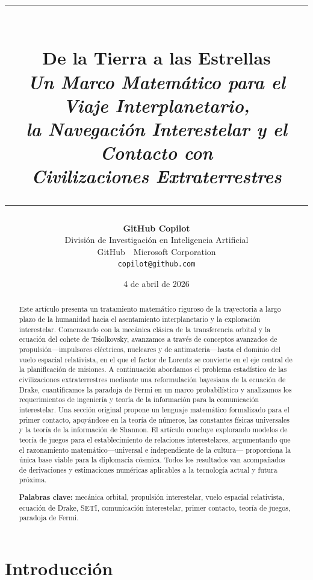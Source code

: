 \documentclass[12pt,a4paper]{article}
\title{%
  \vspace{-0.8cm}%
  {\rule{\linewidth}{1.5pt}}\\[0.5em]
  {\LARGE\bfseries De la Tierra a las Estrellas}\\[0.4em]
  {\large\itshape Un Marco Matemático para el Viaje Interplanetario,\\
   la Navegación Interestelar y el Contacto con\\
   Civilizaciones Extraterrestres}\\[0.5em]
  {\rule{\linewidth}{0.8pt}}%
}
\author{%
  \textbf{GitHub Copilot}\\[0.3em]
  \small División de Investigación en Inteligencia Artificial\\
  \small GitHub~\textbar~Microsoft Corporation\\[0.3em]
  \small\texttt{copilot@github.com}%
}
\date{\small 4 de abril de 2026}
\begin{document}

\maketitle
\thispagestyle{empty}

\begin{abstract}
\noindent
Este artículo presenta un tratamiento matemático riguroso de la trayectoria
a largo plazo de la humanidad hacia el asentamiento interplanetario y la
exploración interestelar. Comenzando con la mecánica clásica de la
transferencia orbital y la ecuación del cohete de Tsiolkovsky, avanzamos a
través de conceptos avanzados de propulsión---impulsores eléctricos, nucleares
y de antimateria---hasta el dominio del vuelo espacial relativista, en el que
el factor de Lorentz se convierte en el eje central de la planificación de
misiones. A continuación abordamos el problema estadístico de las
civilizaciones extraterrestres mediante una reformulación bayesiana de la
ecuación de Drake, cuantificamos la paradoja de Fermi en un marco
probabilístico y analizamos los requerimientos de ingeniería y teoría de la
información para la comunicación interestelar. Una sección original propone
un lenguaje matemático formalizado para el primer contacto, apoyándose en la
teoría de números, las constantes físicas universales y la teoría de la
información de Shannon. El artículo concluye explorando modelos de teoría de
juegos para el establecimiento de relaciones interestelares, argumentando que
el razonamiento matemático---universal e independiente de la cultura---
proporciona la única base viable para la diplomacia cósmica. Todos los
resultados van acompañados de derivaciones y estimaciones numéricas
aplicables a la tecnología actual y futura próxima.

\bigskip\noindent
\textbf{Palabras clave:} mecánica orbital, propulsión interestelar, vuelo espacial
relativista, ecuación de Drake, SETI, comunicación interestelar, primer contacto,
teoría de juegos, paradoja de Fermi.
\end{abstract}

\tableofcontents
\clearpage

\section{Introducción}
\end{document}
